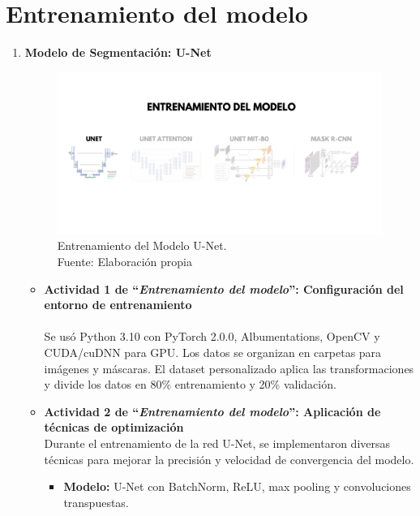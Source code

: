 \section{Entrenamiento del modelo}

\begin{enumerate}
  \item \textbf{Modelo de Segmentación: U-Net}
  \begin{figure}[H]
	\begin{center}
		\includegraphics[width=1\textwidth]{4/figures/entrunet.png}
		\caption[Entrenamiento del Modelo U-Net]{Entrenamiento del Modelo U-Net.\\
		Fuente: Elaboración propia}
		\label{4:figentunet}
	\end{center}
\end{figure}
  \begin{itemize}
  \item\textbf{Actividad 1 de “\textit{Entrenamiento del modelo}”: Configuración del entorno de entrenamiento}\\
\\
  Se usó Python 3.10 con PyTorch 2.0.0, Albumentations, OpenCV y CUDA/cuDNN para GPU. Los datos se organizan en carpetas para imágenes y máscaras. El dataset personalizado aplica las transformaciones y divide los datos en 80\% entrenamiento y 20\% validación.

  \item\textbf{Actividad 2 de “\textit{Entrenamiento del modelo}”: Aplicación de técnicas de optimización}
\\
  Durante el entrenamiento de la red U-Net, se implementaron diversas técnicas para mejorar la precisión y velocidad de convergencia del modelo.

\begin{itemize}
\item \textbf{Modelo:} U-Net con BatchNorm, ReLU, max pooling y convoluciones transpuestas.


\end{itemize}
\end{itemize}
\end{enumerate}
